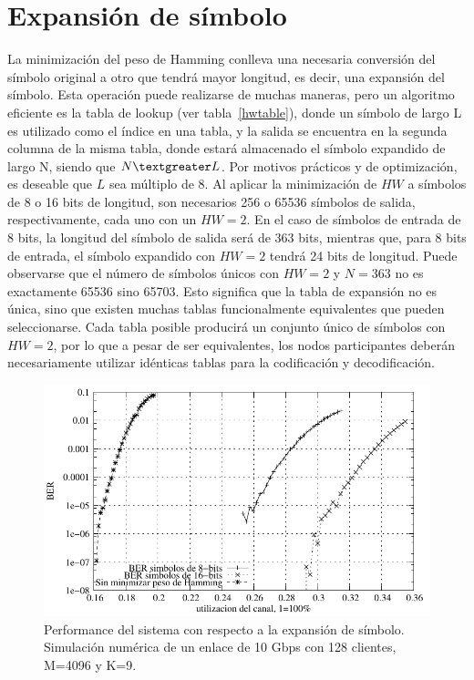\section{Expansión de símbolo}
La minimización del peso de Hamming conlleva una necesaria conversión del símbolo original a otro que tendrá mayor longitud, es decir, una expansión del símbolo.
Esta operación puede realizarse de muchas maneras, pero un algoritmo eficiente es la tabla de lookup (ver tabla~\ref{hwtable}), donde un símbolo de largo L es utilizado como el índice en una tabla, y la salida se encuentra en la segunda columna de la misma tabla, donde estará almacenado el símbolo expandido de largo N, siendo que $N\textgreater L$.
Por motivos prácticos y de optimización, es deseable que $L$ sea múltiplo de 8. Al aplicar la minimización de $HW$ a símbolos de 8 o 16 bits de longitud, son necesarios 256 o 65536 símbolos de salida, respectivamente, cada uno con un $HW=2$. En el caso de símbolos de entrada de 8 bits, la longitud del símbolo de salida será de 363 bits, mientras que, para 8 bits de entrada, el símbolo expandido con $HW=2$ tendrá 24 bits de longitud.
Puede observarse que el número de símbolos únicos con $HW=2$ y $N=363$ no es exactamente 65536 sino 65703. Esto significa que la tabla de expansión no es única, sino que existen muchas tablas funcionalmente equivalentes que pueden seleccionarse. Cada tabla posible producirá un conjunto único de símbolos con $HW=2$, por lo que a pesar de ser equivalentes, los nodos participantes deberán necesariamente utilizar idénticas tablas para la codificación y decodificación.
\begin{figure}[!t]
  \centering
    \includegraphics[width=6in]{graphs/BERvsChannelES2}
    \caption{Performance del sistema con respecto a la expansión de símbolo. Simulación numérica de un enlace de 10 Gbps con 128 clientes, M=4096 y K=9.}
    \label{BERvsExpansion}
\end{figure}

